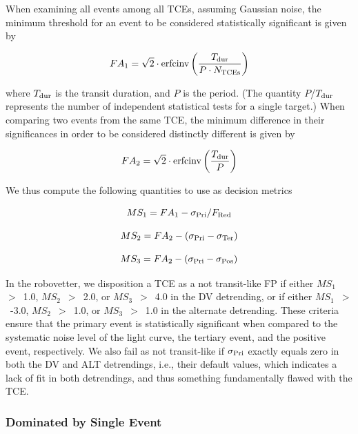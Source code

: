 When examining all events among all TCEs, assuming Gaussian noise, the minimum threshold for an event to be considered statistically significant is given by

\begin{equation}
    FA_{1} = \sqrt{2}\cdot \textrm{erfcinv}\left(\frac{T_{\rm dur}}{P \cdot N_{\rm TCEs}}\right)
\end{equation}

\noindent where $T_{\rm dur}$ is the transit duration, and $P$ is the period. (The quantity $P$/$T_{\rm dur}$ represents the number of independent statistical tests for a single target.) When comparing two events from the same TCE, the minimum difference in their significances in order to be considered distinctly different is given by

\begin{equation}
    FA_{2} = \sqrt{2}\cdot \textrm{erfcinv}\left(\frac{T_{\rm dur}}{P}\right)
\end{equation}

\noindent We thus compute the following quantities to use as decision metrics

\begin{equation}
    MS_{1} = FA_{1} - \sigma_{\rm Pri}/F_{\rm Red}
\end{equation}

\begin{equation}
    MS_{2} = FA_{2} - (\sigma_{\rm Pri} - \sigma_{\rm Ter})
\end{equation}

\begin{equation}
    MS_{3} = FA_{2} - (\sigma_{\rm Pri} - \sigma_{\rm Pos})
\end{equation}

In the robovetter, we disposition a TCE as a not transit-like FP if either $MS_{1}$~$>$~1.0, $MS_{2}$~$>$~2.0, or $MS_{3}$~$>$~4.0 in the DV detrending, or if either $MS_{1}$~$>$~-3.0, $MS_{2}$~$>$~1.0, or $MS_{3}$~$>$~1.0 in the alternate detrending. These criteria ensure that the primary event is statistically significant when compared to the systematic noise level of the light curve, the tertiary event, and the positive event, respectively. We also fail as not transit-like if $\sigma_{\rm Pri}$ exactly equals zero in both the DV and ALT detrendings, i.e., their default values, which indicates a lack of fit in both detrendings, and thus something fundamentally flawed with the TCE.


\subsubsection{Dominated by Single Event}
\label{s:sesmes}

